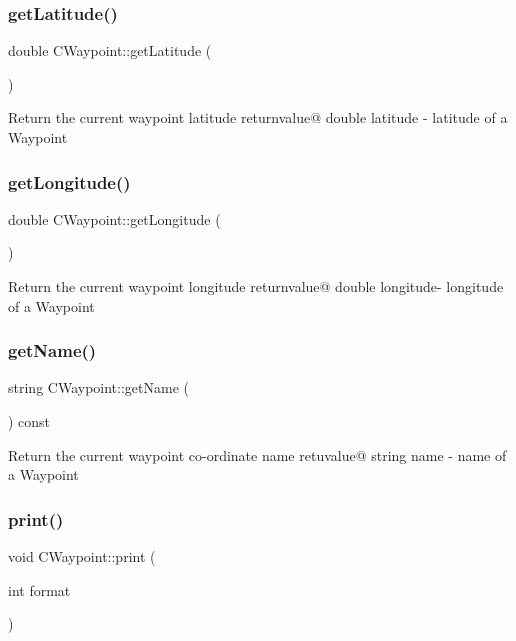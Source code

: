 \subsubsection{\texorpdfstring{get\+Latitude()}{getLatitude()}}
{\footnotesize\ttfamily double C\+Waypoint\+::get\+Latitude (\begin{DoxyParamCaption}{ }\end{DoxyParamCaption})}

Return the current waypoint latitude returnvalue@ double latitude -\/ latitude of a Waypoint \mbox{\label{classCWaypoint_a662b4705b3f60929856ebacdebf8bf2d}} 
\subsubsection{\texorpdfstring{get\+Longitude()}{getLongitude()}}
{\footnotesize\ttfamily double C\+Waypoint\+::get\+Longitude (\begin{DoxyParamCaption}{ }\end{DoxyParamCaption})}

Return the current waypoint longitude returnvalue@ double longitude-\/ longitude of a Waypoint \mbox{\label{classCWaypoint_afa0887a7523a345624046168fe3a2ce5}} 
\subsubsection{\texorpdfstring{get\+Name()}{getName()}}
{\footnotesize\ttfamily string C\+Waypoint\+::get\+Name (\begin{DoxyParamCaption}{ }\end{DoxyParamCaption}) const}

Return the current waypoint co-\/ordinate name retuvalue@ string name -\/ name of a Waypoint \mbox{\label{classCWaypoint_a9a4177a2734842c9395658cb60a70c24}} 
\subsubsection{\texorpdfstring{print()}{print()}}
{\footnotesize\ttfamily void C\+Waypoint\+::print (\begin{DoxyParamCaption}\item[{int}]{format }\end{DoxyParamCaption})\hspace{0.3cm}{\ttfamily [virtual]}}

